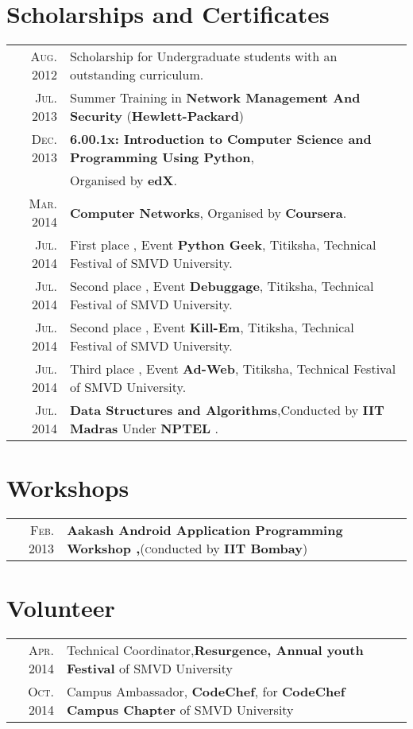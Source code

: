\documentclass[a4paper,10pt]{article}
\begin{document}
\section{Scholarships and Certificates}
\begin{tabular}{rl}
 \textsc{Aug.} 2012 & Scholarship for Undergraduate students with an outstanding curriculum. \normalsize\\
 \textsc{Jul.} 2013 & Summer Training in \normalsize\textbf{Network Management And Security} (\normalsize\textbf{Hewlett-Packard})\normalsize\\
 \textsc{Dec.} 2013 & \normalsize\textbf{6.00.1x: Introduction to Computer Science and Programming Using Python},\\ & Organised by \normalsize\textbf{edX}.\\
 \textsc{Mar.} 2014 & \normalsize\textbf{Computer Networks}, Organised by \normalsize\textbf{Coursera}.\\
 \textsc{Jul.} 2014 & First place , Event \normalsize\textbf{Python Geek}, Titiksha, Technical Festival of SMVD University.\normalsize\\
 \textsc{Jul.} 2014 & Second place , Event \normalsize\textbf{Debuggage}, Titiksha, Technical Festival of SMVD University.\normalsize\\
 \textsc{Jul.} 2014 & Second place , Event \normalsize\textbf{Kill-Em}, Titiksha, Technical Festival of SMVD University.\normalsize\\
 \textsc{Jul.} 2014 & Third place , Event \normalsize\textbf{Ad-Web}, Titiksha, Technical Festival of SMVD University.\normalsize\\
 \textsc{Jul.} 2014 & \normalsize\textbf{Data Structures and Algorithms},Conducted by  \normalsize\textbf{IIT Madras} Under  \normalsize\textbf{NPTEL} .\normalsize\\
\end{tabular}


\section{Workshops}
\begin{tabular}{rl}
 \textsc{Feb.} 2013 & {\normalsize\textbf{Aakash Android Application Programming Workshop ,}}(\textsc conducted by \normalsize\textbf{IIT Bombay})\\
\end{tabular}

\section{Volunteer}
\begin{tabular}{rl}
 \textsc{Apr.} 2014 & Technical Coordinator,\normalsize\textbf{Resurgence, Annual youth Festival} of SMVD University\\
 \textsc{Oct.} 2014 & Campus Ambassador,\normalsize\textbf{   CodeChef}, for \normalsize\textbf{CodeChef Campus Chapter} of SMVD University\\
\end{tabular}
\end{document}

